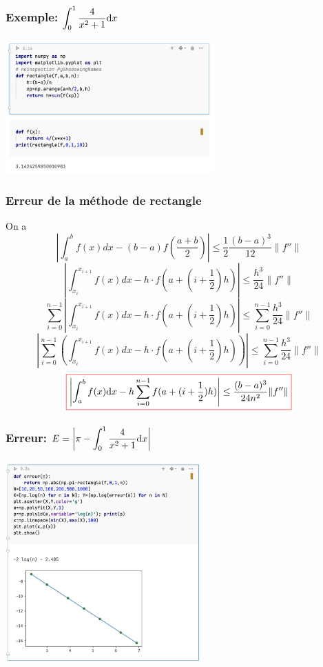 \documentclass{beamer}
\def \de {{\rm d}}
\newcommand{\myredbox}[1]{\fcolorbox{red}{white}{$\displaystyle#1$}}
\begin{document}
\begin{frame}
 \frametitle{Exemple: $\displaystyle \int_0^1\frac{4}{x^2+1}\de x$}
 \includegraphics[width=8cm]{images/methodeDeRectangle00.png}
 

\end{frame}
\begin{frame}
 \frametitle{Erreur de la méthode de rectangle}
 On a 
 \[\left|\int_a^bf(x)dx-(b-a)f(\frac {a+b}2)\right|\leq \frac 12 \frac{(b-a)^3}{12}\|f''\|\]
 \[ \left|\int_{x_i}^{x_{i+1}}f(x)dx-h \cdot f(a+(i+\frac 12)h) \right|\leq  \frac{h^3}{24}\|f''\|\]
  \[ \sum_{i=0}^{n-1}  \left|\int_{x_i}^{x_{i+1}}f(x)dx-h \cdot f(a+(i+\frac 12)h) \right|\leq  \sum_{i=0}^{n-1}  \frac{h^3}{24}\|f''\|\]
  \[ \left| \sum_{i=0}^{n-1}  \left(  \int_{x_i}^{x_{i+1}}f(x)dx-h \cdot f(a+(i+\frac 12)h)\right) \right|\leq  \sum_{i=0}^{n-1}  \frac{h^3}{24}\|f''\|\]
  \[ \myredbox{\left| \int_a^bf(x)\de x -h  \sum_{i=0}^{n-1}  f(a+(i+\frac 12)h) \right| \leq   \frac{(b-a)^3}{24n^2}\|f''\|} \]
 \end{frame}
\begin{frame}
 \frametitle{Erreur: $\displaystyle E=\left|\pi - \int_0^1\frac{4}{x^2+1}\de x \right|$}
\begin{center}
\includegraphics[width=7.5cm]{images/methodeDeRectangle01.png}
\end{center}
 

\end{frame}
\end{document}
